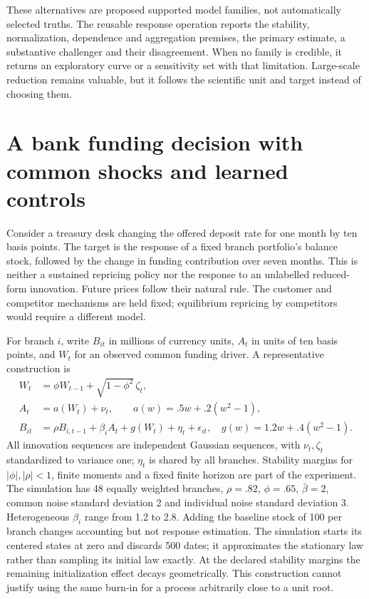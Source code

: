 These alternatives are proposed supported model families, not automatically
selected truths. The reusable response operation reports the stability,
normalization, dependence and aggregation premises, the primary estimate,
a substantive challenger and their disagreement. When no family is credible,
it returns an exploratory curve or a sensitivity set with that limitation.
Large-scale reduction remains valuable, but it follows the scientific unit
and target instead of choosing them.


\section{A bank funding decision with common shocks and learned controls}
\label{s6:funding}
Consider a treasury desk changing the offered deposit rate for one month by
ten basis points. The target is the response of a fixed branch portfolio's
balance stock, followed by the change in funding contribution over seven
months. This is neither a sustained repricing policy nor the response to an
unlabelled reduced-form innovation. Future prices follow their natural rule.
The customer and competitor mechanisms are held fixed; equilibrium repricing
by competitors would require a different model.

For branch $i$, write $B_{it}$ in millions of currency units, $A_t$ in units
of ten basis points, and $W_t$ for an observed common funding driver. A
representative construction is
\begin{align}
 W_t&=\phi W_{t-1}+\sqrt{1-\phi^2}\,\zeta_t,\nonumber\\
 A_t&=a(W_t)+\nu_t,\qquad a(w)=.5w+.2(w^2-1),\nonumber\\
 B_{it}&=\rho B_{i,t-1}+\beta_i A_t+g(W_t)+\eta_t+\epsilon_{it},
 \quad g(w)=1.2w+.4(w^2-1).\label{s6:funding-law}
\end{align}
All innovation sequences are independent Gaussian sequences, with
$\nu_t,\zeta_t$ standardized to variance one; $\eta_t$ is
shared by all branches. Stability margins for $|\phi|,|\rho|<1$, finite
moments and a fixed finite horizon are part of the experiment. The
simulation has 48 equally weighted branches, $\rho=.82$, $\phi=.65$,
$\bar\beta=2$, common noise standard deviation 2 and individual noise
standard deviation 3. Heterogeneous $\beta_i$ range from 1.2 to 2.8.
Adding the baseline stock of 100 per branch changes accounting but not
response estimation.
The simulation starts its centered states at zero and discards 500 dates;
it approximates the stationary law rather than sampling its initial law
exactly. At the declared stability margins the remaining initialization
effect decays geometrically. This construction cannot justify using the
same burn-in for a process arbitrarily close to a unit root.

